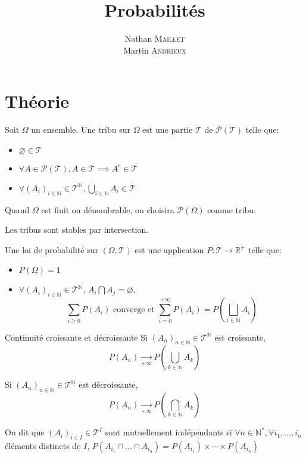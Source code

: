 \documentclass[french, a4paper, 10pt, twocolumn]{article}
\title{Probabilités}
\author{Nathan \textsc{Maillet}\\
  Martin \textsc{Andrieux}}
\date{}
\newcommand{\N}{\mathbb{N}}   %
\newcommand{\R}{\mathbb{R}}   %
\begin{document}
\maketitle

\section{Théorie}
\begin{definition}
  Soit \(\Omega\) un ensemble.
  Une tribu sur \(\Omega\) est une partie \(\mathcal{T}\) de \(\mathcal{P(T)}\) telle que:
  \begin{itemize}[label=\(\bullet\)]
    \item \(\varnothing \in \mathcal{T}\)
    \item \(\forall A \in \mathcal{P(T)}, A \in \mathcal{T} \implies A^c \in  \mathcal{T}\)
    \item \(\forall (A_i)_{i\in \N} \in \mathcal{T}^{\N}, \bigcup_{i\in \N}A_i \in \mathcal{T}\)
  \end{itemize}
  \tcblower
  Quand \(\Omega\) est finit ou dénombrable, on choisira \(\mathcal{P(\Omega)}\) comme tribu.

  Les tribus sont stables par intersection.
\end{definition}

\begin{definition}
  Une loi de probabilité sur $(\Omega,\mathcal{T})$ est une application \(P: \mathcal{T} \rightarrow \R^+\) telle que:
  \begin{itemize}[label=\(\bullet\)]
    \item \(P(\Omega)=1\)
    \item \(\forall {(A_i)}_{i\in \N} \in \mathcal{T}^{\N}\), \(A_i\bigcap A_j =\varnothing\),
      \[\sum_{i\geqslant 0}P(A_i) \text{ converge et } \sum_{i=0}^{+\infty}P(A_i)=P\left(\bigsqcup_{i\in \N}A_i\right)\]
  \end{itemize}
\end{definition}

\begin{theoreme}{Continuité croissante et décroissante}
  Si \({(A_n)}_{n\in \N} \in \mathcal{T}^{\N}\) est croissante, \[P(A_n)\xrightarrow[+\infty]{}P\left(\bigcup_{k\in \N}A_{k}\right)\]

  Si \((A_n)_{n\in \N} \in \mathcal{T}^{\N}\) est décroissante, \[P(A_n)\xrightarrow[+\infty]{}P\left(\bigcap_{k\in \N}A_{k}\right)\]
\end{theoreme}

\begin{definition}
  On dit que \({(A_i)}_{i \in I} \in \mathcal{T}^I\) sont mutuellement indépendants si \(\forall n \in \N^*, \forall i_1,\dots,i_n\)
  éléments distincts de \(I\), \(P(A_{i_1}\cap\dots\cap A_{i_n})=P(A_{i_1})\times\cdots\times P(A_{i_n})\)
\end{definition}
\end{document}
